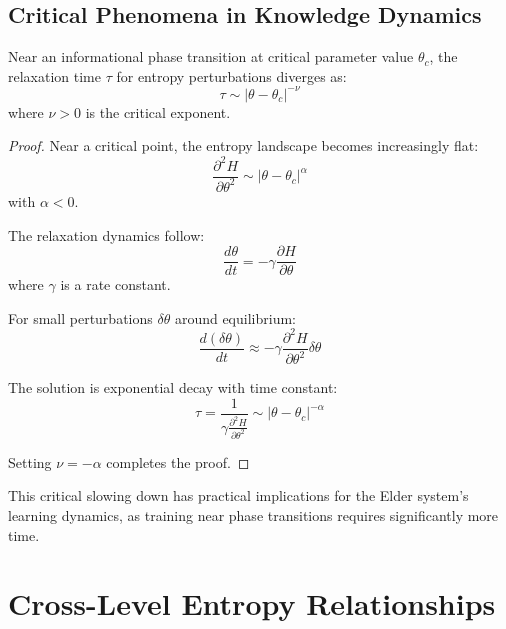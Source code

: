 \subsection{Critical Phenomena in Knowledge Dynamics}

\begin{theorem}
Near an informational phase transition at critical parameter value $\theta_c$, the relaxation time $\tau$ for entropy perturbations diverges as:
\begin{equation}
\tau \sim |\theta - \theta_c|^{-\nu}
\end{equation}
where $\nu > 0$ is the critical exponent.
\end{theorem}

\begin{proof}
Near a critical point, the entropy landscape becomes increasingly flat:
\begin{equation}
\frac{\partial^2 H}{\partial \theta^2} \sim |\theta - \theta_c|^{\alpha}
\end{equation}
with $\alpha < 0$.

The relaxation dynamics follow:
\begin{equation}
\frac{d\theta}{dt} = -\gamma \frac{\partial H}{\partial \theta}
\end{equation}
where $\gamma$ is a rate constant.

For small perturbations $\delta\theta$ around equilibrium:
\begin{equation}
\frac{d(\delta\theta)}{dt} \approx -\gamma \frac{\partial^2 H}{\partial \theta^2} \delta\theta
\end{equation}

The solution is exponential decay with time constant:
\begin{equation}
\tau = \frac{1}{\gamma \frac{\partial^2 H}{\partial \theta^2}} \sim |\theta - \theta_c|^{-\alpha}
\end{equation}

Setting $\nu = -\alpha$ completes the proof.
\end{proof}

This critical slowing down has practical implications for the Elder system's learning dynamics, as training near phase transitions requires significantly more time.

\section{Cross-Level Entropy Relationships}

